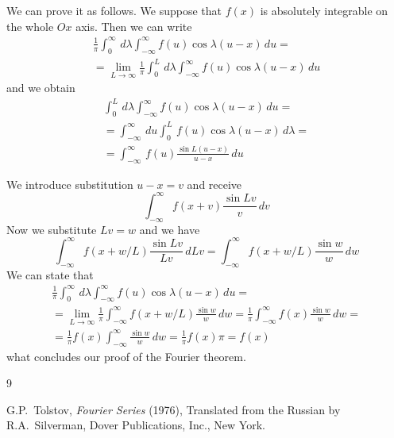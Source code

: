 \documentclass[12pt]{article}
\numberwithin{equation}{section}
\begin{document}
We can prove it as follows.
We suppose that $f(x)$ is absolutely integrable on the whole $Ox$ axis. Then we can write
\begin{eqnarray}
\label{eq:FINT}
                              \frac{1}{\pi} \int_{0}^{\infty} \, d\lambda \int_{-\infty}^{\infty} f(u) \cos \lambda(u-x) \, du =       \\ \nonumber
= \lim_{L \rightarrow \infty} \frac{1}{\pi} \int_{0}^{L} \, d\lambda \int_{-\infty}^{\infty} f(u) \cos \lambda(u-x) \, du
\end{eqnarray}
and we obtain
\begin{eqnarray}
\int_{0}^{L} \, d\lambda \int_{-\infty}^{\infty} f(u) \cos \lambda(u-x) \, du   =                \\ \nonumber
=
\int_{-\infty}^{\infty} \, du \int_{0}^{L} \, f(u) \cos \lambda(u-x) \, d\lambda   =            \\ \nonumber
=
\int_{-\infty}^{\infty} \, f(u) \frac{\sin L(u-x)}{u-x} \, du
\end{eqnarray}

We introduce substitution $u-x=v$ and receive
\begin{equation}
\int_{-\infty}^{\infty} f(x+v) \frac{\sin Lv}{v} \, dv
\end{equation}
Now we substitute $Lv = w$ and we have
\begin{equation}
\int_{-\infty}^{\infty} f(x+w/L) \frac{\sin Lv}{Lv} \, dLv 
=
\int_{-\infty}^{\infty} f(x+w/L) \frac{\sin w}{w} \, dw
\end{equation}
We can state that
\begin{eqnarray}
\frac{1}{\pi}
\int_{0}^{\infty} \, d\lambda \int_{-\infty}^{\infty} f(u) \cos \lambda(u-x) \, du =    \\ \nonumber
=
\lim_{L \rightarrow \infty} \frac{1}{\pi} \int_{-\infty}^{\infty} f(x + w/L) \frac{\sin w}{w} \, dw = 
\frac{1}{\pi} \int_{-\infty}^{\infty} f(x) \frac{\sin w}{w} \, dw               =                     \\ \nonumber
=
\frac{1}{\pi} f(x) \int_{-\infty}^{\infty} \frac{\sin w}{w} \, dw 
=
\frac{1}{\pi} f(x) \pi = f(x)
\end{eqnarray}
what concludes our proof of the Fourier theorem.


\begin{thebibliography}{9}


G.P.~Tolstov, \textit{Fourier Series} (1976), 
Translated from the Russian by 
R.A.~Silverman, Dover Publications, Inc., New York.




\end{thebibliography}
\end{document}
